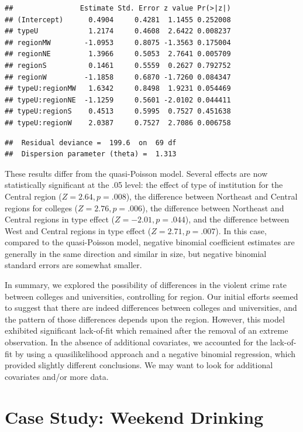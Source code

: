 \documentclass[
]{krantz}
\begin{document}
\begin{verbatim}
##                Estimate Std. Error z value Pr(>|z|)
## (Intercept)      0.4904     0.4281  1.1455 0.252008
## typeU            1.2174     0.4608  2.6422 0.008237
## regionMW        -1.0953     0.8075 -1.3563 0.175004
## regionNE         1.3966     0.5053  2.7641 0.005709
## regionS          0.1461     0.5559  0.2627 0.792752
## regionW         -1.1858     0.6870 -1.7260 0.084347
## typeU:regionMW   1.6342     0.8498  1.9231 0.054469
## typeU:regionNE  -1.1259     0.5601 -2.0102 0.044411
## typeU:regionS    0.4513     0.5995  0.7527 0.451638
## typeU:regionW    2.0387     0.7527  2.7086 0.006758
\end{verbatim}

\begin{verbatim}
##  Residual deviance =  199.6  on  69 df 
##  Dispersion parameter (theta) =  1.313
\end{verbatim}

These results differ from the quasi-Poisson model. Several effects are now statistically significant at the .05 level: the effect of type of institution for the Central region (\(Z=2.64, p=.008\)), the difference between Northeast and Central regions for colleges (\(Z=2.76, p=.006\)), the difference between Northeast and Central regions in type effect (\(Z=-2.01, p=.044\)), and the difference between West and Central regions in type effect (\(Z=2.71, p=.007\)). In this case, compared to the quasi-Poisson model, negative binomial coefficient estimates are generally in the same direction and similar in size, but negative binomial standard errors are somewhat smaller.

In summary, we explored the possibility of differences in the violent crime rate between colleges and universities, controlling for region. Our initial efforts seemed to suggest that there are indeed differences between colleges and universities, and the pattern of those differences depends upon the region. However, this model exhibited significant lack-of-fit which remained after the removal of an extreme observation. In the absence of additional covariates, we accounted for the lack-of-fit by using a quasilikelihood approach and a negative binomial regression, which provided slightly different conclusions. We may want to look for additional covariates and/or more data.

\hypertarget{cs:drinking}{%
\section{Case Study: Weekend Drinking}\label{cs:drinking}}
\end{document}
